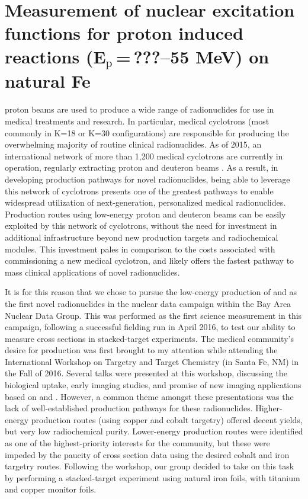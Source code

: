 \chapter{Measurement of nuclear excitation functions for proton induced reactions (\texorpdfstring{E$_{\text{p}}$\,=\,???--55 MeV}{Ep = ???-55 MeV}) on natural Fe}\label{sec:chapter_fe}

 proton beams are used to produce a wide range of radionuclides for use in medical treatments and research.
In particular, medical cyclotrons (most commonly in K=18 or K=30 configurations) are responsible for producing the overwhelming majority of routine clinical radionuclides.
As of 2015, an international network of more than 1,200 medical cyclotrons are currently in operation, regularly extracting proton and deuteron beams \cite{Goethals2015}.
As a result, in developing production pathways for novel radionuclides, being able to leverage this network of cyclotrons presents one of the greatest pathways to enable widespread utilization of next-generation, personalized medical radionuclides.
Production routes using low-energy proton and deuteron beams can be easily exploited by this network of cyclotrons, without the need for investment in additional infrastructure beyond new production targets and radiochemical modules.
This investment pales in comparison to the costs associated with commissioning a new medical cyclotron, and likely offers the fastest pathway to mass clinical applications of novel radionuclides.

It is for this reason that we chose to pursue the low-energy production of  and  as the first novel radionuclides in the nuclear data campaign within the Bay Area Nuclear Data Group.
This was performed as the first science measurement in this campaign, following a successful fielding run in April 2016, to test our ability to measure cross sections in stacked-target experiments.
The medical community's  desire for  production was first brought to my attention while attending the  International Workshop on Targetry and Target Chemistry (in Santa Fe, NM) in the Fall of 2016.
Several talks were presented at this workshop, discussing the biological uptake, early imaging studies, and promise of new imaging applications based on  and  \cite{Graves2016}. 
However, a common theme amongst these presentations was the lack of well-established production pathways for these radionuclides.
Higher-energy production routes (using copper and cobalt targetry) offered decent yields, but very low radiochemical purity.
Lower-energy production routes were identified as one of the highest-priority interests for the community, but these were impeded by the paucity of cross section data using the desired cobalt and iron targetry routes.
Following the workshop, our group decided to take on this task by  performing a stacked-target experiment using natural iron foils, with titanium and copper monitor foils.




